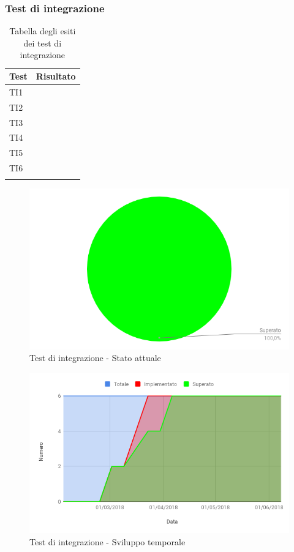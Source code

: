 \subsubsection{Test di integrazione}
\label{esitoTestIntegrazione}
\TestLegend{}
   			\begin{longtable}{ | >{\centering\arraybackslash}m{5cm} | >{\centering\arraybackslash}m{5cm} | }
        
        	\hline
        		\textbf{Test} & \textbf{Risultato} \\ \hline
        	\endhead				
				TI1	&	\done{}	\\ \hline
				TI2 	&	\done{}	\\ \hline
				TI3 	&	\done{} 	\\ \hline
				TI4 	&	\done{}	\\ \hline
				TI5		&	\done{}	\\ \hline
				TI6 	&	\done{}	\\ \hline
			\caption[Esiti test di integrazione]{Tabella degli esiti dei test di integrazione}

			\end{longtable}

			
			\begin{figure}[H]{\textwidth}
  				\centering
  				\includegraphics[width=0.7\linewidth]{./img/Test/testIntegrazione.png}
	  			\caption{Test di integrazione - Stato attuale}
			\end{figure}
			
			\begin{figure}[H]{\textwidth}
  				\centering
  				\includegraphics[width=1\linewidth]{./img/Test/sviluppoIntegrazione.png}
	  			\caption{Test di integrazione - Sviluppo temporale}
			\end{figure}
